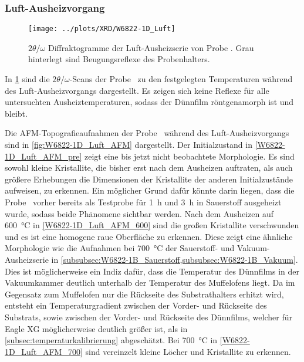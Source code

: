 \subsubsection{Luft-Aus\-heiz\-vor\-gang}\label{subsubsec:W6822-1B_Luft}
\begin{figure}
    \centering
    \texttt{[image: ../plots/XRD/W6822-1D\_Luft]}
    \caption{$2\theta/\omega$ Diffraktogramme der Luft-Ausheizserie von Probe \sampletwo.
    Grau hinterlegt sind Beugungsreflexe des Probenhalters.}
    \label{fig:W6822-1D_Luft_XRD}
\end{figure}

In \cref{fig:W6822-1D_Luft_XRD} sind die $2\theta/\omega$-Scans der Probe \sampletwo\ zu den festgelegten Temperaturen
während des Luft-Aus\-heiz\-vor\-gangs dargestellt.
Es zeigen sich keine Reflexe für alle untersuchten Ausheiztemperaturen, sodass der Dünnfilm röntgenamorph
ist und bleibt.

Die AFM-Topografieaufnahmen der Probe \sampletwo\ während des Luft-Aus\-heiz\-vor\-gangs sind in \cref{fig:W6822-1D_Luft_AFM}
dargestellt.
Der Initialzustand in \cref{W6822-1D_Luft_AFM_pre} zeigt eine bis jetzt nicht beobachtete Morphologie.
Es sind sowohl kleine Kristallite, die bisher erst nach dem Ausheizen auftraten, als auch größere Erhebungen die
Dimensionen der Kristallite der anderen Initialzustände aufweisen, zu erkennen.
Ein möglicher Grund dafür könnte darin liegen, dass die Probe \sampletwo\ vorher bereits als Testprobe für \qty{1}{\hour} und
\qty{3}{\hour} in Sauerstoff ausgeheizt wurde, sodass beide Phänomene sichtbar werden.
Nach dem Ausheizen auf \qty{600}{\degreeCelsius} in \cref{W6822-1D_Luft_AFM_600} sind die großen Kristallite
verschwunden und es ist eine homogene raue Oberfläche zu erkennen.
Diese zeigt eine ähnliche Morphologie wie die Aufnahmen bei \qty{700}{\degreeCelsius} der Sauerstoff- und
Vakuum-Ausheizserie in \cref{subsubsec:W6822-1B_Sauerstoff,subsubsec:W6822-1B_Vakuum}.
Dies ist möglicherweise ein Indiz dafür, dass die Temperatur des Dünnfilms in der Vakuumkammer deutlich
unterhalb der Temperatur des Muffelofens liegt.
Da im Gegensatz zum Muffelofen nur die Rückseite des Substrathalters erhitzt wird, entsteht
ein Temperaturgradient zwischen der Vorder- und Rückseite des Substrats, sowie zwischen der Vorder- und
Rückseite des Dünnfilms, welcher für Eagle XG möglicherweise deutlich größer ist, als in
\cref{subsec:temperaturkalibrierung} abgeschätzt.
Bei \qty{700}{\degreeCelsius} in \cref{W6822-1D_Luft_AFM_700} sind vereinzelt kleine Löcher und Kristallite zu
erkennen.



